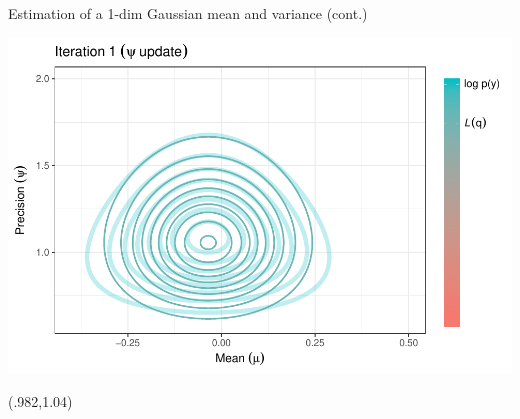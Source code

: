 \begin{frame}{Estimation of a 1-dim Gaussian mean and variance (cont.)}
{\begin{center}
      \includegraphics[scale=0.7]{figure/vbupdate_2}
    \end{center}
  } 
  
  \begin{textblock*}{3cm}(.982\textwidth,1.04\textheight)%
    \hyperlink{cavi}{}      
  \end{textblock*}
\end{frame}
